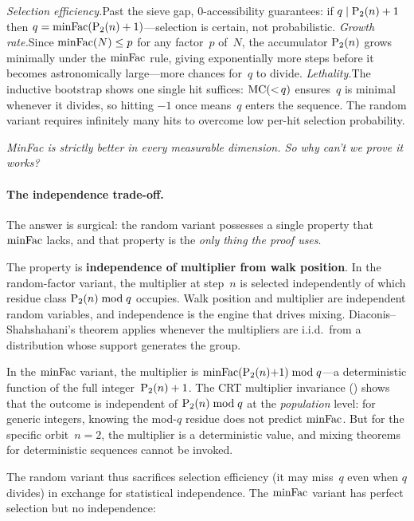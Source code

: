 \smallskip\noindent
\emph{Selection efficiency.}\enspace Past the sieve gap, 0-accessibility
guarantees: if $q \mid \mathrm{P}_{2}(n)+1$ then
$q = \mathrm{minFac}(\mathrm{P}_{2}(n)+1)$---selection is certain, not
probabilistic.  \emph{Growth rate.}\enspace Since
$\mathrm{minFac}(N) \leq p$ for any factor~$p$ of~$N$, the accumulator
$\mathrm{P}_{2}(n)$ grows minimally under the $\mathrm{minFac}$ rule, giving
exponentially more steps before it becomes astronomically large---more
chances for~$q$ to divide.  \emph{Lethality.}\enspace The inductive
bootstrap shows one single hit suffices: $\mathrm{MC}({<}\,q)$ ensures~$q$
is minimal whenever it divides, so hitting $-1$ once means~$q$
enters the sequence.  The random variant requires infinitely many
hits to overcome low per-hit selection probability.

\emph{MinFac is strictly better in every measurable dimension.
So why can't we prove it works?}

\paragraph{The independence trade-off.}
The answer is surgical: the random variant possesses a single property
that $\mathrm{minFac}$ lacks, and that property is the \emph{only thing the
proof uses}.

The property is \textbf{independence of multiplier from walk
position}.  In the random-factor variant, the multiplier at step~$n$
is selected independently of which residue class
$\mathrm{P}_{2}(n) \bmod q$ occupies.  Walk position and multiplier are
independent random variables, and independence is the engine that
drives mixing.  Diaconis--Shahshahani's theorem applies whenever the
multipliers are i.i.d.\ from a distribution whose support generates
the group.

In the $\mathrm{minFac}$ variant, the multiplier is
$\mathrm{minFac}(\mathrm{P}_{2}(n){+}1) \bmod q$---a deterministic function of the
full integer~$\mathrm{P}_{2}(n)+1$.  The CRT multiplier invariance
() shows
that the outcome is independent of $\mathrm{P}_{2}(n) \bmod q$ at the
\emph{population} level: for generic integers, knowing the mod-$q$
residue does not predict $\mathrm{minFac}$.  But for the specific orbit~$n=2$,
the multiplier is a deterministic value, and mixing theorems for
deterministic sequences cannot be invoked.

The random variant thus sacrifices selection efficiency (it may
miss~$q$ even when $q$ divides) in exchange for statistical
independence.  The $\mathrm{minFac}$ variant has perfect selection but no
independence:

